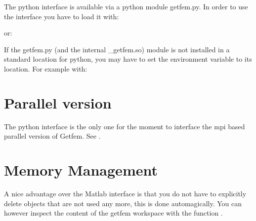 \documentclass[a4paper,11pt,english]{sphinxmanual}
\begin{document}
The python interface is available via a python module getfem.py. In order to
use the interface you have to load it with:

\begin{sphinxVerbatim}[commandchars=\\\{\}]
 
     
\end{sphinxVerbatim}

or:

\begin{sphinxVerbatim}[commandchars=\\\{\}]
   
     
\end{sphinxVerbatim}

If the getfem.py (and the internal \_getfem.so) module is not installed in a
standard location for python, you may have to set the 
environment variable to its location. For example with:

\begin{sphinxVerbatim}[commandchars=\\\{\}]
 
\end{sphinxVerbatim}


\section{Parallel version}
\label{\detokenize{python/pygf:parallel-version}}
The python interface is the only one for the moment to interface the mpi based parallel version of Getfem. See .


\section{Memory Management}
\label{\detokenize{python/pygf:memory-management}}
A nice advantage over the Matlab interface is that you do not have to
explicitly delete objects that are not used any more, this is done
automagically. You can however inspect the content of the getfem workspace
with the function .
\end{document}
